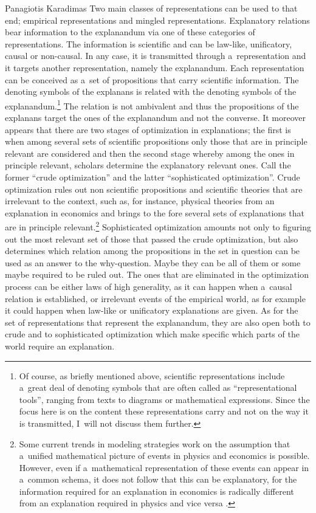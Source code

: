 \begin{artengenv}{Panagiotis Karadimas}
Two main classes of representations can be used to that end; empirical representations and mingled representations. Explanatory relations bear information to the explanandum via one of these categories of representations. The information is scientific and can be law-like, unificatory, causal or non-causal. In any case, it is transmitted through a~representation and it targets another representation, namely the explanandum. Each representation can be conceived as a~set of propositions that carry scientific information. The denoting symbols of the explanans is related with the denoting symbols of the explanandum.\footnote{Of course, as briefly mentioned above, scientific representations include a~great deal of denoting symbols that are often called as ``representational tools'', ranging from texts to diagrams or mathematical expressions. Since the focus here is on the content these representations carry and not on the way it is transmitted, I~will not discuss them further.} The relation is not ambivalent and thus the propositions of the explanans target the ones of the explanandum and not the converse. It moreover appears that there are two stages of optimization in explanations; the first is when among several sets of scientific propositions only those that are in principle relevant are considered and then the second stage whereby among the ones in principle relevant, scholars determine the explanatory relevant ones. Call the former ``crude optimization'' and the latter ``sophisticated optimization''. Crude optimization rules out non scientific propositions and scientific theories that are irrelevant to the context, such as, for instance, physical theories from an explanation in economics and brings to the fore several sets of explanations that are in principle relevant.\footnote{Some current trends in modeling strategies work on the assumption that a~unified mathematical picture of events in physics and economics is possible. However, even if a~mathematical representation of these events can appear in a~common schema, it does not follow that this can be explanatory, for the information required for an explanation in economics is radically different from an explanation required in physics and vice versa
\parencite[][p.125]{woodward_unificationism_2016}.%
} Sophisticated optimization amounts not only to figuring out the most relevant set of those that passed the crude optimization, but also determines which relation among the propositions in the set in question can be used as an answer to the why-question. Maybe they can be all of them or some maybe required to be ruled out. The ones that are eliminated in the optimization process can be either laws of high generality, as it can happen when a~causal relation is established, or irrelevant events of the empirical world, as for example it could happen when law-like or unificatory explanations are given. As for the set of representations that represent the explanandum, they are also open both to crude and to sophisticated optimization which make specific which parts of the world require an explanation.


\end{artengenv}

